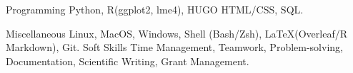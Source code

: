 

\begin{cvskills}

  \cvskill
    {Programming} %
    {Python, R(ggplot2, lme4), HUGO HTML/CSS, SQL.} %

  \cvskill
    {Miscellaneous} %
    {Linux, MacOS, Windows, Shell (Bash/Zsh), \LaTeX (Overleaf/R Markdown), Git.} %
  \cvskill
    {Soft Skills} %
    {Time Management, Teamwork, Problem-solving, Documentation, Scientific Writing, Grant Management.} %

\end{cvskills}
